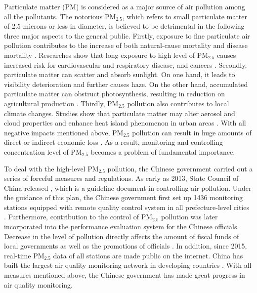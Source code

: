 \documentclass[12pt]{article}
\numberwithin{equation}{section}
\begin{document}
Particulate matter (PM) is considered as a major source of air pollution among all the pollutants. The notorious PM$_{2.5}$, which refers to small particulate matter of 2.5 microns or less in diameter, is believed to be detrimental in the following three major aspects to the general public. Firstly, exposure to fine particulate air pollution contributes to the increase of both natural-cause mortality and disease mortality \citep{lung,article7,article6}.
Researches show that long exposure to high level of PM$_{2.5}$ causes increased risk for cardiovascular and respiratory disease, and cancers \citep{article5, web4}. Secondly, particulate matter can scatter and absorb sunlight. On one hand, it leads to visibility deterioration and further causes haze. On the other hand, accumulated particulate matter can obstruct photosynthesis, resulting in reduction on agricultural production \citep{article9,article10}. Thirdly, PM$_{2.5}$ pollution also contributes to local climate changes. Studies show that particulate matter may alter aerosol and cloud properties and enhance heat island phenomenon in urban areas \citep{article13,article12}. With all negative impacts mentioned above, PM$_{2.5}$ pollution can result in huge amounts of direct or indirect economic loss \citep{article15,article14}. As a result, monitoring and controlling concentration level of PM$_{2.5}$ becomes a problem of fundamental importance.

To deal with the high-level PM$_{2.5}$ pollution, the Chinese government carried out a series of forceful measures and regulations. As early as 2013, State Council of China released , which is a guideline document in controlling air pollution. Under the guidance of this plan, the Chinese government first set up 1436 monitoring stations equipped with remote quality control system in all prefecture-level cities \citep{web10}.  Furthermore, contribution to the control of PM$_{2.5}$ pollution was later incorporated into the performance evaluation system for the Chinese officials. Decrease in the level of pollution directly affects the amount of fiscal funds of local governments as well as the promotions of officials \citep{web7}. In addition, since 2015, real-time PM$_{2.5}$ data of all stations are made public on the internet. China has built the largest air quality monitoring network in developing countries \citep{web10}. With all measures mentioned above, the Chinese government has made great progress in air quality monitoring.
\end{document}

